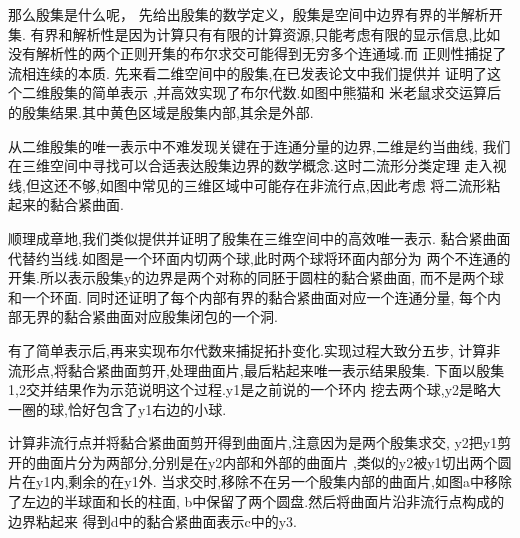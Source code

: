 \documentclass[UTF8]{ctexbeamer}	%
\theoremstyle{plain}
\theoremstyle{definition}
\theoremstyle{remark}
\numberwithin{equation}{section}
\begin{document}
\begin{frame}
  那么殷集是什么呢，
  先给出殷集的数学定义，殷集是空间中边界有界的半解析开集.
  有界和解析性是因为计算只有有限的计算资源,只能考虑有限的显示信息,比如
  没有解析性的两个正则开集的布尔求交可能得到无穷多个连通域.而
  正则性捕捉了流相连续的本质.
  先来看二维空间中的殷集,在已发表论文中我们提供并
  证明了这个二维殷集的简单表示
  ,并高效实现了布尔代数.如图中熊猫和
  米老鼠求交运算后的殷集结果.其中黄色区域是殷集内部,其余是外部.
\end{frame}

\begin{frame}
  从二维殷集的唯一表示中不难发现关键在于连通分量的边界,二维是约当曲线,
  我们在三维空间中寻找可以合适表达殷集边界的数学概念.这时二流形分类定理
  走入视线,但这还不够,如图中常见的三维区域中可能存在非流行点,因此考虑
  将二流形粘起来的黏合紧曲面.
\end{frame}

\begin{frame}
  顺理成章地,我们类似提供并证明了殷集在三维空间中的高效唯一表示.
  黏合紧曲面代替约当线.如图是一个环面内切两个球,此时两个球将环面内部分为
  两个不连通的开集.所以表示殷集y的边界是两个对称的同胚于圆柱的黏合紧曲面,
  而不是两个球和一个环面.
  同时还证明了每个内部有界的黏合紧曲面对应一个连通分量,
  每个内部无界的黏合紧曲面对应殷集闭包的一个洞.
\end{frame}

\begin{frame}
  有了简单表示后,再来实现布尔代数来捕捉拓扑变化.实现过程大致分五步,
  计算非流形点,将黏合紧曲面剪开,处理曲面片,最后粘起来唯一表示结果殷集.
  下面以殷集1,2交并结果作为示范说明这个过程.y1是之前说的一个环内
  挖去两个球,y2是略大一圈的球,恰好包含了y1右边的小球.
\end{frame}

\begin{frame}
  计算非流行点并将黏合紧曲面剪开得到曲面片,注意因为是两个殷集求交,
  y2把y1剪开的曲面片分为两部分,分别是在y2内部和外部的曲面片
  ,类似的y2被y1切出两个圆片在y1内,剩余的在y1外.
  当求交时,移除不在另一个殷集内部的曲面片,如图a中移除了左边的半球面和长的柱面,
  b中保留了两个圆盘.然后将曲面片沿非流行点构成的边界粘起来
  得到d中的黏合紧曲面表示c中的y3.
\end{frame}
\end{document}
